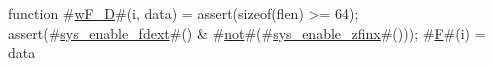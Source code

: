 function #\hyperref[sailRISCVzwFzyD]{wF\_D}#(i, data) = {
  assert(sizeof(flen) >= 64);
  assert(#\hyperref[sailRISCVzsyszyenablezyfdext]{sys\_enable\_fdext}#() & #\hyperref[sailRISCVznot]{not}#(#\hyperref[sailRISCVzsyszyenablezyzzfinx]{sys\_enable\_zfinx}#()));
  #\hyperref[sailRISCVzF]{F}#(i) = data
}

